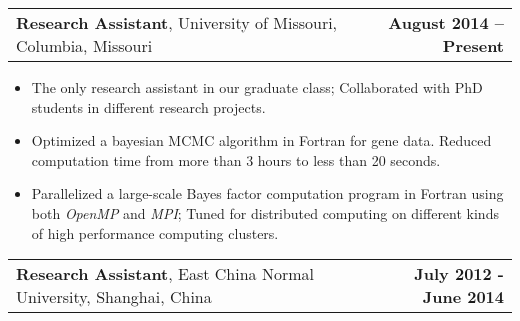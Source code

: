 \documentclass[11pt]{article}
\makeatletter
\newcommand{\headerrow}[2]
{\begin{tabular*}{\linewidth}{l@{\extracolsep{\fill}}r}
	#1 & #2 \\
\end{tabular*}
}
\makeatother
\begin{document}
\headerrow
{\textbf{Research Assistant}, University of Missouri, Columbia, Missouri}
{\textbf{August 2014 – Present}}
\begin{itemize}
	\item The only research assistant in our graduate class; Collaborated with PhD students in different research projects.
	\item Optimized a bayesian MCMC algorithm in Fortran for gene data. Reduced computation time from more than 3 hours to less than 20 seconds.
	\item Parallelized a large-scale Bayes factor computation program in Fortran using both \emph{OpenMP} and \emph{MPI}; Tuned for distributed computing on different kinds of high performance computing clusters.
\end{itemize}

\noindent\headerrow
{\textbf{Research Assistant}, East China Normal University, Shanghai, China}
{\textbf{July 2012 - June 2014}}
\end{document}

